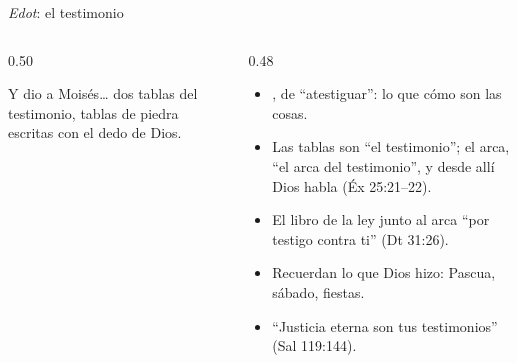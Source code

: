 \begin{frame}{\emph{Edot}: el testimonio}
\begin{columns}[c,onlytextwidth]
\begin{column}{0.50\textwidth}
\begin{cita}Y dio a Moisés\ldots{} dos tablas del testimonio, tablas de piedra escritas con el dedo de Dios.\end{cita}
\begin{center}\end{center}
\end{column}
\begin{column}{0.48\textwidth}\small
\begin{itemize}
\item {}, de  ``atestiguar'': lo que  cómo son las cosas.
\item Las tablas son ``el testimonio''; el arca, ``el arca del testimonio'', y desde allí Dios habla (Éx 25:21--22).
\item El libro de la ley junto al arca ``por testigo contra ti'' (Dt 31:26).
\item Recuerdan lo que Dios hizo: Pascua, sábado, fiestas.
\item ``Justicia eterna son tus testimonios'' (Sal 119:144).
\end{itemize}
\end{column}
\end{columns}
\end{frame}

